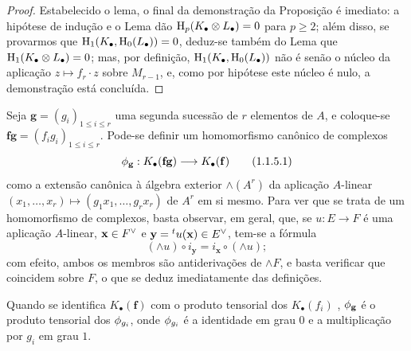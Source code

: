 \begin{proof}
Estabelecido o lema, o final da demonstração da Proposição  é imediato: a hipótese de indução e o Lema  dão $\mathrm{H}_p(K_\bullet\otimes L_\bullet)=0$ para $p\geq 2$; além disso, se provarmos que $\mathrm{H}_1(K_\bullet,\mathrm{H}_0(L_\bullet))=0$, deduz-se também do Lema  que $\mathrm{H}_1(K_\bullet\otimes L_\bullet)=0$; mas, por definição, $\mathrm{H}_1(K_\bullet,\mathrm{H}_0(L_\bullet))$ não é senão o núcleo da aplicação $z\mapsto f_r\cdot z$ sobre $M_{r-1}$, e, como por hipótese este núcleo é nulo, a demonstração está concluída.
\end{proof}

\begin{env}[1.1.5]
\label{III.1.1.5}
Seja $\mathbf{g}=(g_i)_{1\leq i\leq r}$ uma segunda sucessão de $r$ elementos de $A$, e coloque-se $\mathbf{f}\mathbf{g}=(f_i g_i)_{1\leq i\leq r}$.
Pode-se definir um homomorfismo canônico de complexos
\[
  \vphi_\mathbf{g}:K_\bullet(\mathbf{f}\mathbf{g})\to K_\bullet(\mathbf{f})
  \tag{1.1.5.1}
\]
como a extensão canônica à álgebra exterior $\wedge(A^r)$ da aplicação $A$-linear $(x_1,\dots,x_r)\mapsto(g_1 x_1,\dots,g_r x_r)$ de $A^r$ em si mesmo.
Para ver que se trata de um homomorfismo de complexos, basta observar, em geral, que, se $u:E\to F$ é uma aplicação $A$-linear, $\mathbf{x}\in{F}^\vee$ e $\mathbf{y}={}^t u(\mathbf{x})\in{E}^\vee$, tem-se a fórmula
\[
  (\wedge u)\circ i_\mathbf{y}=i_\mathbf{x}\circ(\wedge u);
  \tag{1.1.5.2}
\]
com efeito, ambos os membros são antiderivações de $\wedge F$, e basta verificar que coincidem sobre $F$, o que se deduz imediatamente das definições.

Quando se identifica $K_\bullet(\mathbf{f})$ com o produto tensorial dos $K_\bullet(f_i)$ , $\phi_\mathbf{g}$ é o produto tensorial dos $\phi_{g_i}$, onde $\phi_{g_i}$ é a identidade em grau $0$ e a multiplicação por $g_i$ em grau $1$.
\end{env}

